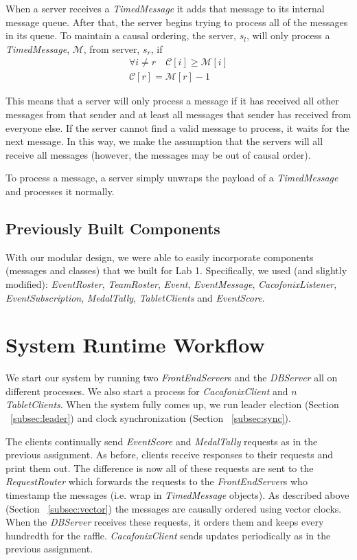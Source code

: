 \documentclass[11pt]{article}
\begin{document}
When a server receives a \emph{TimedMessage} it adds that message to
its internal message queue. After that, the server begins trying to
process all of the messages in its queue.  To maintain a causal
ordering, the server, $s_l$, will only process a \emph{TimedMessage},
$\mathcal{M}$, from server, $s_r$, if
\begin{align*}
 \forall i \ne r \quad \mathcal{C}[i] \ge \mathcal{M}[i] \\
 \mathcal{C}[r] = \mathcal{M}[r] - 1
\end{align*}

This means that a server will only process a message if it has
received all other messages from that sender and at least all messages
that sender has received from everyone else.  If the server cannot
find a valid message to process, it waits for the next message. In
this way, we make the assumption that the servers will all receive all
messages (however, the messages may be out of causal order).

To process a message, a server simply unwraps the payload of a
\emph{TimedMessage} and processes it normally.

\subsection{Previously Built Components}
With our modular design, we were able to easily incorporate components
(messages and classes) that we built for Lab 1.  Specifically, we used
(and slightly modified): \emph{EventRoster}, \emph{TeamRoster},
\emph{Event}, \emph{EventMessage}, \emph{CacofonixListener},
\emph{EventSubscription}, \emph{MedalTally}, \emph{TabletClients}
and \emph{EventScore}.

\section{System Runtime Workflow}
We start our system by running two \emph{FrontEndServer}s and the
\emph{DBServer} all on different processes.  We also start a process
for \emph{CacafonixClient} and $n$ \emph{TabletClients}.  When the system
fully comes up, we run leader election (Section ~\ref{subsec:leader})
and clock synchronization (Section ~\ref{subsec:sync}).

The clients continually send \emph{EventScore} and \emph{MedalTally}
requests as in the previous assignment. As before, clients receive
responses to their requests and print them out. The difference is now
all of these requests are sent to the \emph{RequestRouter} which
forwards the requests to the \emph{FrontEndServer}s who timestamp the
messages (i.e. wrap in \emph{TimedMessage} objects).  As described
above (Section ~\ref{subsec:vector}) the messages are causally ordered
using vector clocks.  When the \emph{DBServer} receives these
requests, it orders them and keeps every hundredth for the raffle.
\emph{CacafonixClient} sends updates periodically as in the previous
assignment.
\end{document}
